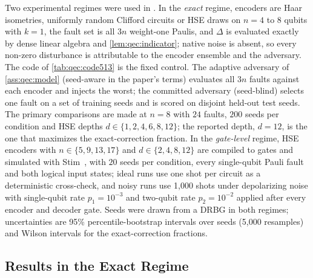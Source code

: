 Two experimental regimes were used in \cite{guo2026qecaudit}. In the \emph{exact} regime, encoders are Haar isometries, uniformly random Clifford circuits or HSE draws on $n=4$ to $8$ qubits with $k=1$, the fault set is all $3n$ weight-one Paulis, and $\Delta$ is evaluated exactly by dense linear algebra and \cref{lem:qec:indicator}; native noise is absent, so every non-zero disturbance is attributable to the encoder ensemble and the adversary. The  code of \cref{tab:qec:code513} is the fixed control. The adaptive adversary of \cref{ass:qec:model} (seed-aware in the paper's terms) evaluates all $3n$ faults against each encoder and injects the worst; the committed adversary (seed-blind) selects one fault on a set of training seeds and is scored on disjoint held-out test seeds. The primary comparisons are made at $n=8$ with $24$ faults, $200$ seeds per condition and HSE depths $d\in\{1,2,4,6,8,12\}$; the reported depth, $d=12$, is the one that maximizes the exact-correction fraction. In the \emph{gate-level} regime, HSE encoders with $n\in\{5,9,13,17\}$ and $d\in\{2,4,8,12\}$ are compiled to gates and simulated with Stim~\cite{gidney2021stim}, with $20$ seeds per condition, every single-qubit Pauli fault and both logical input states; ideal runs use one shot per circuit as a deterministic cross-check, and noisy runs use 1,000 shots under depolarizing noise with single-qubit rate $p_1=10^{-3}$ and two-qubit rate $p_2=10^{-2}$ applied after every encoder and decoder gate. Seeds were drawn from a DRBG in both regimes; uncertainties are 95\% percentile-bootstrap intervals over seeds (5,000 resamples) and Wilson intervals for the exact-correction fractions.

\subsection{Results in the Exact Regime}\label{sec:qec:results513}

